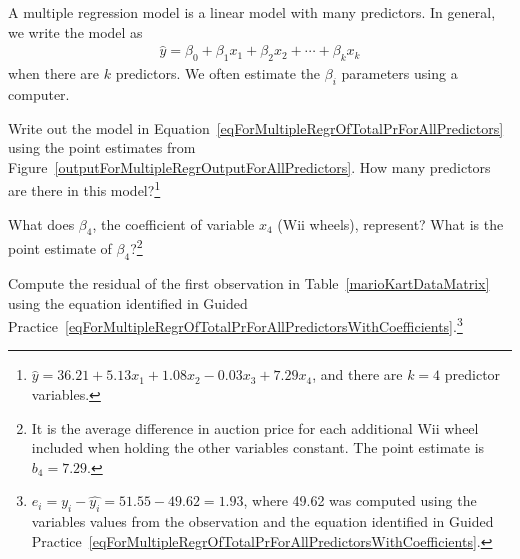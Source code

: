 \begin{termBox}{
A multiple regression model is a linear model with many predictors. In general, we write the model as
\begin{align*}
\hat{y} = \beta_0 + \beta_1 x_1 + \beta_2 x_2 + \cdots + \beta_k x_k %
\end{align*}
when there are $k$ predictors. We often estimate the $\beta_i$ parameters using a computer.\vspace{1mm}}
\end{termBox}

\begin{exercise} \label{eqForMultipleRegrOfTotalPrForAllPredictorsWithCoefficients}
Write out the model in Equation~\eqref{eqForMultipleRegrOfTotalPrForAllPredictors} using the point estimates from Figure~\ref{outputForMultipleRegrOutputForAllPredictors}. How many predictors are there in this model?\footnote{$\hat{y} = 36.21 + 5.13x_1 + 1.08x_2 - 0.03x_3 + 7.29x_4$, and there are $k=4$ predictor variables.}
\end{exercise}

\begin{exercise}
What does $\beta_4$, the coefficient of variable $x_4$ (Wii wheels), represent? What is the point estimate of $\beta_4$?\footnote{It is the average difference in auction price for each additional Wii wheel included when holding the other variables constant. The point estimate is $b_4 = 7.29$.}
\end{exercise}

\begin{exercise} \label{computeMultipleRegressionResidualForMarioKart}
Compute the residual of the first observation in Table~\vref{marioKartDataMatrix} using the equation identified in Guided Practice~\ref{eqForMultipleRegrOfTotalPrForAllPredictorsWithCoefficients}.\footnote{$e_i = y_i - \hat{y_i} = 51.55 - 49.62 = 1.93$, where 49.62 was computed using the variables values from the observation and the equation identified in Guided Practice~\ref{eqForMultipleRegrOfTotalPrForAllPredictorsWithCoefficients}.}
\end{exercise}

